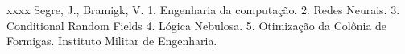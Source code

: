 \documentclass[
	12pt,				%
	oneside,			%
	a4paper,			%
	english,			%
	brazil,				%
	]{ime-abntex2}
\begin{document}


\imprimircapa
%

\imprimirfolhaderosto*
%


%
%     
\imprimirfichacatalografica
{xxxx}
{Segre, J., Bramigk, V.}
{1. Engenharia da computação.
 2. Redes Neurais.
 3. Conditional Random Fields
 4. Lógica Nebulosa.
 5. Otimização da Colônia de Formigas. Instituto Militar de Engenharia.
}

%
%
%
%
\end{document}
